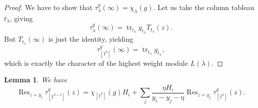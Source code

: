 \documentclass[11pt]{report}
\newtheorem{lemma}[theorem]{Lemma}
\theoremstyle{definition}
\theoremstyle{remark}
\theoremstyle{remark}
\begin{document}
\begin{proof}
We have to show that $\tau_\lambda^g(\infty) = \chi_\lambda(g)$. Let us take the column tableau $t_\lambda$, giving
\begin{equation*}
\tau_\lambda^g(\infty) = \operatorname{tr}_{t_\lambda} g_{t_\lambda} T_{t_\lambda}(z).
\end{equation*}
But $T_{t_\lambda}(\infty)$ is just the identity, yielding
\begin{equation*}
\tau_{[1^k]}^g(\infty) = \operatorname{tr}_{t_\lambda} g_{t_\lambda},
\end{equation*}
which is exactly the character of the highest weight module $L(\lambda)$.
\end{proof}

\begin{lemma}
We have
\begin{equation*}
\operatorname{Res}_{z=y_i} \tau_{[1^{k+1}]}^g(z)
= \chi_{[1^k]}(g) H_i + \sum_j \frac{\eta H_i}{y_i-y_j-\eta} \operatorname{Res}_{z=y_j} \tau_{[1^k]}^g(z).
\end{equation*}
\end{lemma}
\end{document}
